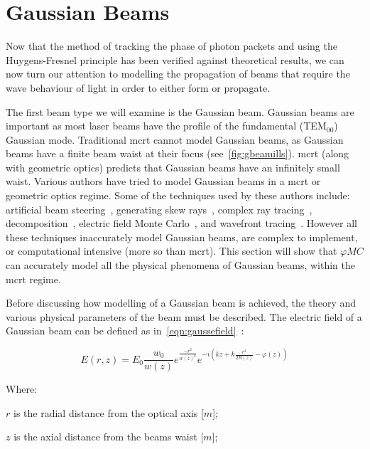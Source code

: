 \FloatBarrier

\section{Gaussian Beams}

Now that the method of tracking the phase of photon packets and using the Huygens-Fresnel principle has been verified against theoretical results, we can now turn our attention to modelling the propagation of beams that require the wave behaviour of light in order to either form or propagate.

The first beam type we will examine is the Gaussian beam.
Gaussian beams are important as most laser beams have the profile of the fundamental (TEM$_{00}$) Gaussian mode.
Traditional \gls*{mcrt} cannot model Gaussian beams, as Gaussian beams have a finite beam waist at their focus (see~\cref{fig:gbeamills}).
\Gls*{mcrt} (along with geometric optics) predicts that Gaussian beams have an infinitely small waist.
Various authors have tried to model Gaussian beams in a \gls*{mcrt} or geometric optics regime.
Some of the techniques used by these authors include: artificial beam steering~\cite{hokr2015modeling}, generating skew rays~\cite{arnaud1985representation}, complex ray tracing~\cite{harvey2015modeling}, decomposition~\cite{worku2018decomposition}, electric field Monte Carlo~\cite{cai2014electric}, and wavefront tracing~\cite{volpe2017huygens}. %
However all these techniques inaccurately model Gaussian beams, are complex to implement, or computational intensive (more so than \gls*{mcrt}).
This section will show that $\varphi MC$ can accurately model all the physical phenomena of Gaussian beams, within the \gls*{mcrt} regime.

Before discussing how modelling of a Gaussian beam is achieved, the theory and various physical parameters of the beam must be described. 
The electric field of a Gaussian beam can be defined as in~\cref{eqn:gaussefield}~\cite{milonni2010laser}:

\begin{equation}
E(r,z)=E_0\frac{w_0}{w(z)}e^{\frac{-r^2}{w(z)^2}}e^{-i(kz+k\frac{r^2}{2R(z)}-\varphi(z))}
\label{eqn:gaussefield}
\end{equation}

\noindent Where:

    \indent $r$ is the radial distance from the optical axis [$m$];

    \indent $z$ is the axial distance from  the beams waist [$m$];

